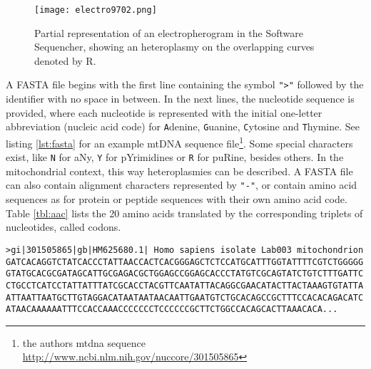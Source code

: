 \begin{figure}[ht]
\begin{center}
\texttt{[image: electro9702.png]}
\caption[Representation of an electropherogram]{Partial representation of an electropherogram in the Software Sequencher, showing an heteroplasmy on the overlapping curves denoted by R.}
\label{fig:figureElectro}
\end{center}
\end{figure}
\newline
A FASTA file begins with the first line containing the symbol \verb|">"| followed by the identifier with no space in between. In the next lines, the nucleotide sequence is provided, where each nucleotide is represented with the initial one-letter abbreviation (nucleic acid code) for \verb|A|denine, \verb|G|uanine, \verb|C|ytosine and \verb|T|hymine. See listing  \ref{lst:fasta} for an example mtDNA sequence file\footnote{the authors mtdna sequence \url{http://www.ncbi.nlm.nih.gov/nuccore/301505865}}. Some special characters exist, like \verb|N| for aNy, \verb|Y| for pYrimidines or \verb|R| for puRine, besides others. In the mitochondrial context, this way heteroplasmies can be described. A FASTA file can also contain alignment characters represented by \verb|"-"|,  or contain amino acid sequences as for protein or peptide sequences with their own amino acid code. Table \ref{tbl:aac} lists the 20 amino acids translated by the corresponding triplets of nucleotides, called codons.
\newline
{\small 
\begin{lstlisting}[caption= {Excerpt of an mtDNA fasta file, here the first 350 bases of 16,570}, label={lst:fasta}]
>gi|301505865|gb|HM625680.1| Homo sapiens isolate Lab003 mitochondrion
GATCACAGGTCTATCACCCTATTAACCACTCACGGGAGCTCTCCATGCATTTGGTATTTTCGTCTGGGGG
GTATGCACGCGATAGCATTGCGAGACGCTGGAGCCGGAGCACCCTATGTCGCAGTATCTGTCTTTGATTC
CTGCCTCATCCTATTATTTATCGCACCTACGTTCAATATTACAGGCGAACATACTTACTAAAGTGTATTA
ATTAATTAATGCTTGTAGGACATAATAATAACAATTGAATGTCTGCACAGCCGCTTTCCACACAGACATC
ATAACAAAAAATTTCCACCAAACCCCCCCTCCCCCCGCTTCTGGCCACAGCACTTAAACACA...
\end{lstlisting}
}

